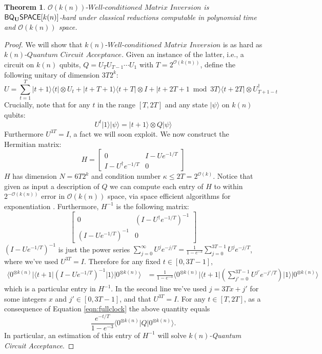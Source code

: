 \documentclass[11pt]{article}
\newtheorem{theorem}{Theorem}
\theoremstyle{definition}
\theoremstyle{remark}
\newcommand\matrixinvert[1]{{\ensuremath{#1}}\textit{-Well-conditioned Matrix Inversion}}
\newcommand\qca[1]{\ensuremath{#1}\textit{-Quantum Circuit Acceptance}}
\newcommand{\zero}{\ensuremath{0^{\otimes{k(n)}}}}
\newcommand{\classfont}{\sf}
\newcommand{\Unitary}{\mathbf{U}}
\newcommand{\unitaryBQSPACE}[1]{{\classfont{BQ}_\Unitary\classfont{SPACE}}[#1]}
\newcommand\bigoh{\mathcal{O}}
\begin{document}
\begin{theorem}
$\matrixinvert{\bigoh(k(n))}$ is $\unitaryBQSPACE{k(n)}$-hard under classical reductions computable in polynomial time and $\bigoh (k(n))$ space.
\end{theorem}
\begin{proof}
We will show that $\matrixinvert{k(n)}$ is as hard as $\qca{k(n)}$.  Given an instance of the latter, i.e., a circuit on $k(n)$ qubits, $Q=U_TU_{T-1}\cdots U_1$ with $T = 2^{\mathcal{O}(k(n))}$, define the following unitary of dimension $3T2^k$:
\[U=\sum_{t=1}^{T}|t+1\rangle\langle t|\otimes U_t+|t+T+1\rangle\langle t+T|\otimes I+|t+2T+1\bmod{3T}\rangle\langle t+2T|\otimes U_{T+1-t}^{\dagger}\]	
Crucially, note that for any $t$ in the range $[T,2T]$ and any state $|\psi\rangle$ on $k(n)$ qubits: 
\begin{equation}\label{eqn:fullclock}
	U^t|1\rangle|\psi\rangle=|t+1\rangle\otimes Q|\psi\rangle
\end{equation}
Furthermore $U^{3T}=I$, a fact we will soon exploit. We now construct the Hermitian matrix:
\begin{equation}
H=\begin{bmatrix}
    0 & I-Ue^{-1/T}\\
   I-U^{\dagger}e^{-1/T} &  0
\end{bmatrix}
\end{equation}
 $H$ has dimension $N=6T2^k$ and condition number $\kappa\leq 2T=2^{\bigoh (k)}$.  Notice that given as input a description of $Q$ we can compute each entry of $H$ to within $2^{-\mathcal{O}(k(n))}$ error in $\mathcal{O}(k(n))$ space, via space efficient algorithms for exponentiation \cite{reif}.
   Furthermore, $H^{-1}$ is the following matrix:
\begin{equation}
\begin{bmatrix}
    0 & \left(I-U^\dagger e^{-1/T}\right)^{-1}\\
   \left(I-Ue^{-1/T}\right)^{-1} &  0
\end{bmatrix}
\end{equation}
$\left(I-Ue^{-1/T}\right)^{-1}$ is just the power series $\sum_{j=0}^\infty U^j e^{-j/T}=\frac{1}{1-e^{-3}}\sum_{j=0}^{3T-1} U^{j} e^{-j/T}$, where we've used $U^{3T}=I$. Therefore for any fixed $t \in [0,3T-1]$,
 \begin{align}
\langle\zero|\langle t+1|\left(I-Ue^{-1/T}\right)^{-1}|1\rangle|\zero\rangle
&= \frac{1}{1-e^{-3}}\langle\zero|\langle t+1|\left(\sum_{j'=0}^{3T-1} U^{j'} e^{-j'/T}\right)|1\rangle|\zero\rangle
\end{align}
which is a particular entry in $H^{-1}$. In the second line we've used $j = 3Tx + j'$ for some integers $x$ and $j' \in [0,3T-1]$, and that $U^{3T}=I$.  For any $t \in [T,2T]$, as a consequence of Equation \ref{eqn:fullclock} the above quantity equals
\begin{equation}
\frac{e^{-t/T}}{1-e^{-3}}\langle\zero|Q|\zero\rangle.
\end{equation}
In particular, an estimation of this entry of $H^{-1}$ will solve \qca{k(n)}.
\end{proof}
\end{document}
